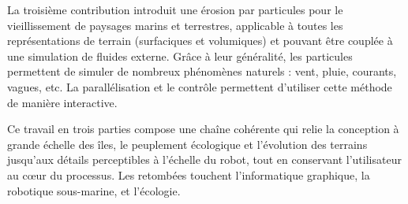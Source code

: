 La troisième contribution introduit une érosion par particules pour le vieillissement de paysages marins et terrestres, applicable à toutes les représentations de terrain (surfaciques et volumiques) et pouvant être couplée à une simulation de fluides externe. Grâce à leur généralité, les particules permettent de simuler de nombreux phénomènes naturels : vent, pluie, courants, vagues, etc. La parallélisation et le contrôle permettent d'utiliser cette méthode de manière interactive.

Ce travail en trois parties compose une chaîne cohérente qui relie la conception à grande échelle des îles, le peuplement écologique et l'évolution des terrains jusqu'aux détails perceptibles à l'échelle du robot, tout en conservant l'utilisateur au cœur du processus. Les retombées touchent l'informatique graphique, la robotique sous-marine, et l'écologie.




































